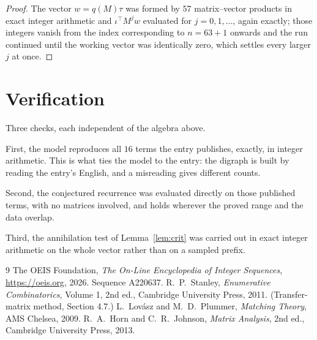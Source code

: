 \documentclass[11pt,a4paper]{article}
\theoremstyle{plain}
\theoremstyle{definition}
\begin{document}
\begin{proof}
The vector $w=q(M)\tau$ was formed by $57$ matrix--vector products in exact integer
arithmetic and $\iota^{\!\top}M^{j}w$ evaluated for $j=0,1,\dots$, again exactly; those
integers vanish from the index corresponding to $n=63+1$ onwards and the run continued
until the working vector was identically zero, which settles every larger $j$ at once.
\end{proof}

\section{Verification}

Three checks, each independent of the algebra above.

First, the model reproduces all $16$ terms the entry publishes, exactly, in integer
arithmetic. This is what ties the model to the entry: the digraph is built by reading the
entry's English, and a misreading gives different counts.

Second, the conjectured recurrence was evaluated directly on those published terms, with no
matrices involved, and holds wherever the proved range and the data overlap.

Third, the annihilation test of Lemma~\ref{lem:crit} was carried out in exact integer
arithmetic on the whole vector rather than on a sampled prefix.

\begin{thebibliography}{9}
 The OEIS Foundation, \emph{The On-Line Encyclopedia of Integer
Sequences}, \url{https://oeis.org}, 2026. Sequence A220637.
 R.~P.~Stanley, \emph{Enumerative Combinatorics}, Volume 1, 2nd ed.,
Cambridge University Press, 2011. (Transfer-matrix method, Section 4.7.)
 L.~Lov\'asz and M.~D.~Plummer, \emph{Matching Theory}, AMS Chelsea,
2009.
 R.~A.~Horn and C.~R.~Johnson, \emph{Matrix Analysis}, 2nd ed., Cambridge
University Press, 2013.
\end{thebibliography}
\end{document}
